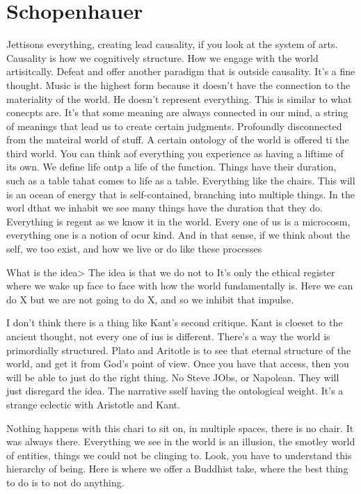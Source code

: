 \documentclass[12pt,letterpaper]{article}
\begin{document}
\section{Schopenhauer}
Jettisons everything, creating lead causality,  if you look  at the system of arts.  Causality is how we cognitively structure.  How we engage with the world artisitcally.  Defeat and offer another paradigm that is outside causality.  It's a fine thought.  Music is the highest form because it doesn't have the connection to the materiality of the world.  He doesn't represent everything.  This is similar to what conecpts are.  It's that some meaning are always connected in our mind, a string of meanings that lead us to create certain judgments.  Profoundly disconnected from the mateiral world of stuff.  A certain ontology of the world is offered ti the third world.  You can think aof everything you experience as having a liftime of its own.  We define life ontp a life of the function.  Things have their duration, such as a table tahat comes to life as a table.  Everything like the chairs.  This will is an ocean of energy that is self-contained, branching into multiple things.  In the worl dthat we inhabit we see many things have the duration that they do.  Everything is regent as we know it in the world.  Every one of us is a microcosm, everything one is a notion of ocur kind.  And in that sense, if we think about the self, we too exist, and how we live or do like these processes

What is the idea> The idea is that we do not to  It's only the ethical register where we wake up face to face with how the world fundamentally is.  Here we can do X but we are not going to do X, and so we inhibit that impulse.

I don't think there is a thing like Kant's second critique.  Kant is cloeset to the ancient thought, not every one of ius is different.  There's a way the world is primordially structured.  Plato and Aritotle is to see that eternal structure of the world, and get it from God's point of view.  Once you have that access, then you will be able to just do the right thing.  No Steve JObs, or Napolean.  They will just disregard the idea.  The narrative sself having the ontological weight.  It's a strange eclectic with Aristotle and Kant.

Nothing happens with this chari to sit on, in multiple spaces, there is no chair.  It was always there.  Everything we see in the world is an illusion, the smotley world of entities, things we could not be clinging to.  Look, you have to understand this hierarchy of being.  Here is where we offer a Buddhist take, where the best thing to do is to not do anything.
\end{document}
